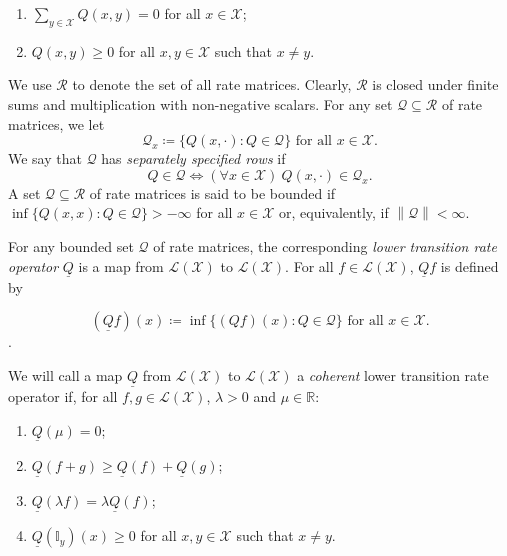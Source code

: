 \documentclass[a4paper,reqno]{amsart}
\newcommand{\reals}{\mathbb{R}}
\newcommand{\states}{\mathcal{X}}
\newcommand{\gambles}{\mathcal{L}}
\newcommand{\gamblesX}{\gambles(\states)}
\newcommand{\ind}[1]{\mathbb{I}_{#1}}
\newcommand{\rateset}{\mathcal{Q}}
\newcommand{\lrate}{\underline{Q}}
\newcommand{\asa}{\Leftrightarrow}
\newcommand{\norm}[1]{\left\lVert #1 \right\rVert}
\begin{document}
\vspace{5pt}
\begin{enumerate}[label=R\arabic*:]
\item
$\sum_{y\in\states}Q(x,y)=0$ for all $x\in\states$;
\item
$Q(x,y)\geq0$ for all $x,y\in\states$ such that $x\neq y$.
\end{enumerate}
\vspace{5pt}
\noindent
We use $\mathcal{R}$ to denote the set of all rate matrices. Clearly, $\mathcal{R}$ is closed under finite sums and multiplication with non-negative scalars. For any set $\rateset\subseteq\mathcal{R}$ of rate matrices, we let
\begin{equation*}
\rateset_x\coloneqq\{Q(x,\cdot)\colon Q\in\rateset\}
\text{ for all $x\in\states$.}
\end{equation*}
We say that $\rateset$ has \emph{separately specified rows} if
\begin{equation*}
Q\in\rateset\asa(\forall x\in\states)~Q(x,\cdot)\in\rateset_x.
\end{equation*}
A set $\rateset\subseteq\mathcal{R}$ of rate matrices is said to be bounded if $\inf\{Q(x,x)\colon Q\in\rateset\}>-\infty$ for all $x\in\states$ or, equivalently, if $\norm{\rateset}<\infty$. 

For any bounded set $\rateset$ of rate matrices, the corresponding \emph{lower transition rate operator} $\lrate$ is a map from $\gamblesX$ to $\gamblesX$. For all $f\in\gamblesX$, $\lrate f$ is defined by

\begin{equation}\label{eq:deflowerbound}
(\lrate f)(x)\coloneqq\inf\{(Qf)(x)\colon Q\in\rateset\}\text{ for all $x\in\states$}.
\end{equation}.

We will call a map $\lrate$ from $\gamblesX$ to $\gamblesX$ a \emph{coherent} lower transition rate operator if, for all $f,g\in\gamblesX$, $\lambda>0$ and $\mu\in\reals$:

\vspace{5pt}
\begin{enumerate}[label=LR\arabic*:]
\item
$\lrate(\mu)=0$;
\item
$\lrate(f+g)\geq\lrate(f)+\lrate(g)$;
\item
$\lrate(\lambda f)=\lambda\lrate(f)$;
\item
$\lrate(\ind{y})(x)\geq0$ for all $x,y\in\states$ such that $x\neq y$.
\end{enumerate}
\vspace{5pt}
\end{document}
